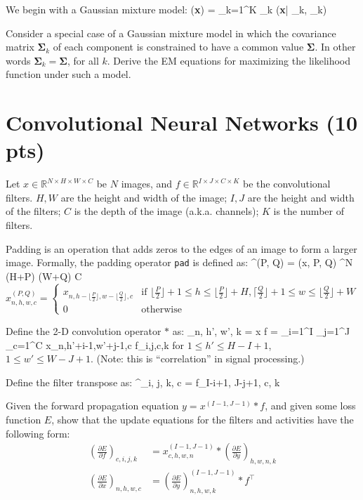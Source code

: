 \documentclass[12pt]{article}
\def\beqa#1\eeqa{\begin{eqnarray}#1\end{eqnarray}}
\newcommand{\bmu}{{\boldsymbol{\mu}}}
\newcommand{\bSigma}{{\boldsymbol{\Sigma}}}
\newcommand{\bx}{{\bf{x}}}
\begin{document}
We begin with  a Gaussian mixture model:
\beqa
 p(\bx) = \sum_{k=1}^K \pi_k {}(\bx | \bmu_k, \bSigma_k)
\eeqa

Consider a special case of a Gaussian mixture model in which the covariance
matrix $\bSigma_k$ of each component is constrained to have a common
value $\bSigma$.  In other words $\bSigma_k = \bSigma$, for all $k$.  Derive
the EM equations for maximizing the likelihood function under such a model.

\section{Convolutional Neural Networks (10 pts)}
Let $x \in \mathbb{R}^{N \times H \times W \times C}$ be $N$ images, and 
$f \in \mathbb{R}^{I \times J \times C \times K}$ be the convolutional 
filters.
$H, W$ are the height and width of the image; 
$I, J$ are the height and width of the filters;
$C$ is the depth of the image (a.k.a. channels); 
$K$ is the number of filters.

Padding is an operation that adds zeros to the edges of an image to form a 
larger image. Formally, the padding operator {\tt pad} is defined as:
\beqa
x^{(P, Q)} = (x, P, Q) 
\in {}^{N \times (H+P) \times (W+Q) \times C}
\eeqa
\begin{equation}
x_{n, h, w, c}^{(P, Q)} = \begin{cases}
x_{n, h- \lfloor \frac{P}{2} \rfloor, w - \lfloor \frac{Q}{2} \rfloor, c} & 
\text{if } \lfloor \frac{P}{2} \rfloor + 1 \le h \le \lfloor \frac{P}{2}\rfloor+H, 
\lceil \frac{Q}{2} \rfloor + 1 \le w \le \lfloor \frac{Q}{2}\rfloor+W\\
0 &\text{otherwise}
\end{cases}
\end{equation}

Define the 2-D convolution operator $\ast$ as:
\beqa
y_{n, h', w', k} = x \ast f = 
\sum_{i=1}^{I} 
\sum_{j=1}^{J} 
\sum_{c=1}^C x_{n,h'+i-1,w'+j-1,c} \cdot f_{i,j,c,k}
\eeqa
for $1 \le h' \le H - I + 1$, $1 \le w' \le W - J + 1$. 
(Note: this is ``correlation'' in signal processing.)

Define the filter transpose as:
\beqa
f^\top_{i, j, k, c} = f_{I-i+1, J-j+1, c, k}
\eeqa

Given the forward propagation equation $y = x^{(I-1, J-1)} \ast f$,
and given some loss function $E$,
show that the update equations for the filters and activities have the 
following form:
\begin{align}
\left (\frac{\partial E}{\partial f} \right )_{c, i, j, k} &= 
x_{c, h, w, n}^{(I-1, J-1)}
\ast 
\left (\frac{\partial E}{\partial y} \right )_{h, w, n, k} \\
\left (\frac{\partial E}{\partial x} \right )_{n, h, w, c} &= 
\left (\frac{\partial E}{\partial y} \right )_{n, h, w, k} ^{(I-1, J-1)}
\ast f^\top
\end{align}
\end{document}
